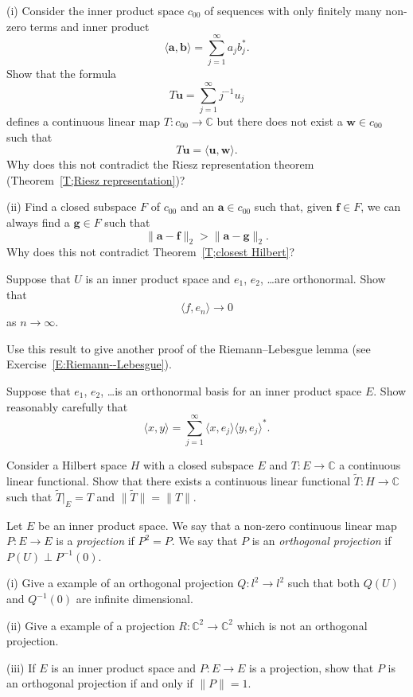 \begin{exercise}\label{C3.7} (i) Consider the inner product space $c_{00}$ 
of sequences with only finitely many non-zero terms and inner
product
\[\langle {\mathbf a},{\mathbf b}\rangle=
\sum_{j=1}^{\infty}a_{j}b_{j}^{*}.\]
Show that the formula
\[T{\mathbf u}=\sum_{j=1}^{\infty}j^{-1}u_{j}\]
defines a continuous linear map $T:c_{00}\rightarrow{\mathbb C}$
but there does not exist a ${\mathbf w}\in  c_{00}$ such that
\[T{\mathbf u}=\langle {\mathbf u},{\mathbf w}\rangle.\]
Why does this not contradict the Riesz representation theorem
(Theorem~\ref{T;Riesz representation})?

(ii) Find a closed subspace $F$ of $c_{00}$
and an ${\mathbf a}\in c_{00}$ such that,
given  ${\mathbf f}\in F$,
we can always find a ${\mathbf g}\in F$ such that
\[\|{\mathbf a}-{\mathbf f}\|_{2}>\|{\mathbf a}-{\mathbf g}\|_{2}.\]
Why does this not contradict Theorem~\ref{T;closest Hilbert}?
\end{exercise}
\begin{exercise}\label{C3.8} Suppose that $U$ is an inner product space
and $e_{1}$, $e_{2}$, \dots are orthonormal. Show that
\[\langle f,e_{n}\rangle\rightarrow 0\]
as $n\rightarrow\infty$. 

Use this result to give another proof of the Riemann--Lebesgue
lemma (see Exercise~\ref{E:Riemann--Lebesgue}).
\end{exercise}
\begin{exercise}\label{C3.9} 
Suppose that $e_{1}$, $e_{2}$, \dots is an orthonormal
basis for an inner product space $E$. Show reasonably carefully that
\[\langle x,y\rangle=\sum_{j=1}^{\infty}
\langle x,e_{j}\rangle\langle y,e_{j}\rangle^{*}.\]
\end{exercise}
\begin{exercise}\label{C3.10} Consider
a Hilbert space $H$ with a closed subspace 
$E$ and $T:E\rightarrow{\mathbb C}$ a continuous linear
functional. Show that there exists a continuous linear
functional $\tilde{T}:H\rightarrow{\mathbb C}$ such that
$\tilde{T}|_{E}=T$ and $\|\tilde{T}\|=\|T\|$.

\end{exercise}
\begin{exercise}\label{C3.11} Let $E$ be an inner product space.
We say that a non-zero continuous linear map $P:E\rightarrow E$
is a \emph{projection} if $P^{2}=P$. We say that $P$
is an \emph{orthogonal projection} if $P(U)\perp P^{-1}(0)$.

(i) Give a example of an orthogonal projection $Q:l^{2}\rightarrow l^{2}$
such that both $Q(U)$ and $Q^{-1}(0)$ are infinite dimensional.

(ii)  Give a example of a projection 
$R:{\mathbb C}^{2}\rightarrow {\mathbb C}^{2}$ which is 
not an orthogonal projection.

(iii) If $E$ is an inner product space and $P:E\rightarrow E$ 
is a projection, show that $P$ is an orthogonal projection
if and only if $\|P\|=1$.
\end{exercise}

